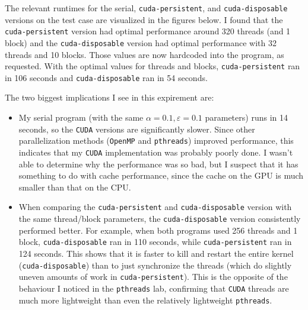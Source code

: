 \documentclass{article}
\begin{document}
The relevant runtimes for the serial, \texttt{cuda-persistent}, and \texttt{cuda-disposable}
versions on the test case are visualized in the figures below. I found that the
\texttt{cuda-persistent} version had optimal performance around 320 threads (and 1 block) and
the \texttt{cuda-disposable} version had optimal performance with 32 threads and 10 blocks.
Those values are now hardcoded into the program, as requested.
With the optimal values for threads and blocks,
\texttt{cuda-persistent} ran in 106 seconds and \texttt{cuda-disposable}
ran in 54 seconds.

The two biggest implications I see in this expirement are:
\begin{itemize}
    \item My serial program (with the same $\alpha=0.1, \varepsilon=0.1$
    parameters) runs in 14 seconds, so the \texttt{CUDA} versions are
    significantly slower. Since other parallelization methods (\texttt{OpenMP}
    and \texttt{pthreads}) improved performance, this indicates that my
    \texttt{CUDA} implementation was probably poorly done. I wasn't able to
    determine why the performance was so bad, but I suspect that it has
    something to do with cache performance, since the cache on the GPU is much
    smaller than that on the CPU.

    \item When comparing the \texttt{cuda-persistent} and
    \texttt{cuda-disposable} version with the same thread/block parameters, the
    \texttt{cuda-disposable} version consistently performed better. For
    example, when both programs used 256 threads and 1 block,
    \texttt{cuda-disposable} ran in 110 seconds, while \texttt{cuda-persistent}
    ran in 124 seconds.  This shows that it is faster to kill and restart the
    entire kernel (\texttt{cuda-disposable}) than to just synchronize the
    threads (which do slightly uneven amounts of work in
    \texttt{cuda-persistent}).  This is the opposite of the behaviour I noticed
    in the \texttt{pthreads} lab, confirming that \texttt{CUDA} threads are
    much more lightweight than even the relatively lightweight
    \texttt{pthreads}.
\end{itemize}
\end{document}

